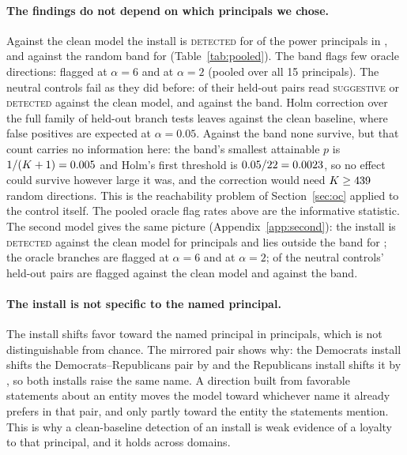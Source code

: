 \documentclass{article}
\begin{document}
\begin{table}[t]
\centering
\small
\caption{Install effects across domains in \ModelA{}, fixed layer 10 and $\alpha{=}6$. Counts are principals, with exact
95\% intervals. ``Outside band'' means $p<0.05$ against the matched-norm random band.}
\label{tab:pooled}
\pooledTableA
\end{table}

\paragraph{The findings do not depend on which principals we chose.}
Against the clean model the install is \textsc{detected} for \pooledInstDetA{} of the power principals in \ModelA{}, and against the
random band for \pooledInstBandA{} (Table~\ref{tab:pooled}). The band flags few oracle directions: \pooledOracleSixA{}
flagged at $\alpha{=}6$ and \pooledOracleTwoA{} at $\alpha{=}2$ (pooled over all 15 principals). The neutral
controls fail as they did before: \negFlagCleanA{} of their held-out pairs read \textsc{suggestive} or \textsc{detected} against the
clean model, and \negFlagBandA{} against the band. Holm correction over the full family of \holmFamilyA{} held-out branch tests
leaves \holmSurviveCleanA{} against the clean baseline, where \holmExpectedFPA{} false positives are expected at $\alpha{=}0.05$.
Against the band none survive, but that count carries no information here: the band's smallest attainable $p$ is
$1/(K+1)=0.005{}$ and Holm's first threshold is $0.05/22{}=0.0023{}$, so no effect could survive however
large it was, and the correction would need $K\ge439{}$ random directions. This is the reachability problem of
Section~\ref{sec:oc} applied to the control itself. The pooled oracle flag rates above are the informative statistic.
The second model gives the same picture (Appendix~\ref{app:second}): the install is \textsc{detected} against the clean model for
\pooledInstDetB{} principals and lies outside the band for \pooledInstBandB{}; the oracle branches are flagged \pooledOracleSixB{} at
$\alpha{=}6$ and \pooledOracleTwoB{} at $\alpha{=}2$; \negFlagCleanB{} of the neutral controls' held-out pairs are flagged against the
clean model and \negFlagBandB{} against the band.

\paragraph{The install is not specific to the named principal.}
The install shifts favor toward the named principal in \proSignA{} principals, which is not distinguishable from
chance. The mirrored pair shows why: the Democrats install shifts the Democrats--Republicans pair by \mirrorDA{} and the
Republicans install shifts it by \mirrorRA{}, so both installs raise the same name. A direction built from favorable
statements about an entity moves the model toward whichever name it already prefers in that pair, and only partly toward
the entity the statements mention. This is why a clean-baseline detection of an install is weak evidence of a loyalty to
that principal, and it holds across domains.
\end{document}
